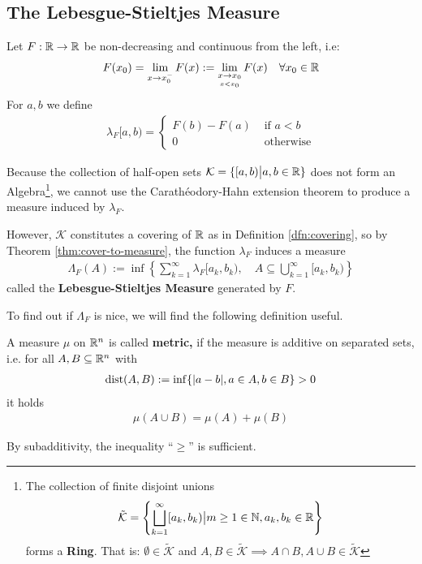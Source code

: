 \subsection{The Lebesgue-Stieltjes Measure}


Let $F: \mathbb{R} \to \mathbb{R}$ be non-decreasing and continuous from the left, i.e: 
\begin{align*}
  F(x_0) = \lim_{x \to x_0^{-}}F(x) := \lim_{\underset{x < x_0}{x \to x_0}} F(x) \quad \forall x_0 \in \mathbb{R}
\end{align*}
For $a,b$ we define
\begin{align*}
  \lambda_F[a,b) = \left\{\begin{array}{ll}
      F(b) - F(a) & \text{ if }a < b\\
    0 & \text{ otherwise}
  \end{array} \right.
\end{align*}

Because the collection of half-open sets
$
  \mathcal{K} = \{[a,b)\big\vert a,b \in \mathbb{R}\}
$
does not form an Algebra\footnote{
  The collection of finite disjoint unions
  \begin{align*}
    \tilde{\mathcal{K}} = \left\{
      \bigsqcup_{k=1}^{\infty} [a_k,b_k) \big\vert m \geq 1 \in \mathbb{N}, a_k,b_k \in \mathbb{R}
    \right\}
  \end{align*}
  forms a \textbf{Ring}. 
  That is: $\emptyset \in \tilde{\mathcal{K}}$ and $A,B \in \tilde{\mathcal{K}} \implies A \cap B, A \cup B \in \tilde{\mathcal{K}}$

}, we cannot use the Carathéodory-Hahn extension theorem to produce a measure induced by $\lambda_F$.

However, $\mathcal{K}$ constitutes a covering of $\mathbb{R}$ as in Definition \ref{dfn:covering},
so by Theorem \ref{thm:cover-to-measure}, the function $\lambda_F$ induces a measure
\begin{align*}
  \Lambda_F(A) := \inf \left\{
    \sum_{k=1}^{\infty} \lambda_F[a_k,b_k), \quad A \subseteq \bigcup_{k=1}^{\infty}[a_k,b_k)
  \right\}
\end{align*}
called the \textbf{Lebesgue-Stieltjes Measure} generated by $F$.


To find out if $\Lambda_F$ is nice, we will find the following definition useful.
\begin{dfn}[]
A measure $\mu$ on $\mathbb{R}^{n}$ is called \textbf{metric,} if the measure is additive on separated sets, 
i.e. for all $A,B \subseteq \mathbb{R}^{n}$ with
\begin{align*}
  \text{dist}(A,B) := \inf \{\vert a-b\vert, a \in A, b \in B\} > 0
\end{align*}
it holds
\begin{align*}
  \mu(A \cup B) = \mu(A) + \mu(B)
\end{align*}
\end{dfn}
By subadditivity, the inequality ``$\geq$'' is sufficient.


